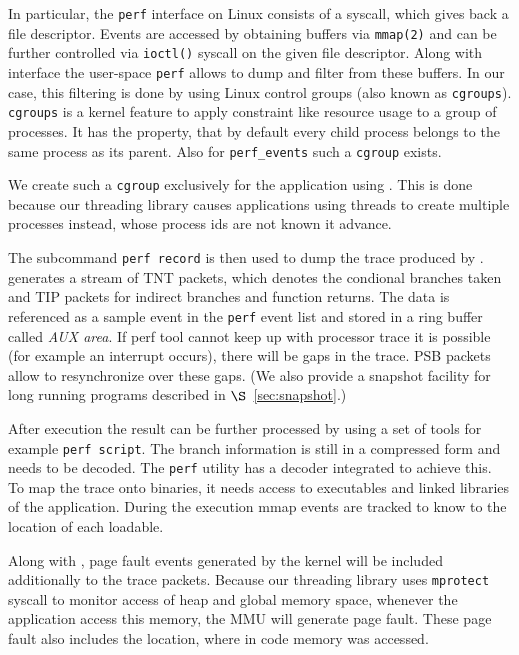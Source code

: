  

In particular, the {\tt perf} interface on Linux consists of a syscall, which gives back a file
descriptor. Events are accessed by obtaining buffers via {\tt mmap(2)} and can be
further controlled via {\tt ioctl()} syscall on the given file descriptor. Along with
interface the user-space {\tt perf} allows to dump and filter from these
buffers. In our case, this filtering is done by using Linux control
groups (also known as {\tt cgroups}). {\tt cgroups} is a kernel feature to apply constraint
like resource usage to a group of processes. It has the property, that by
default every child process belongs to the same process as its parent. Also for
{\tt perf\_events} such a {\tt cgroup} exists.

We create such a {\tt cgroup} exclusively for the application using \projecttitle. This is done because
our threading library causes applications using threads to create multiple
processes instead, whose process ids are not known it advance.

The subcommand {\tt perf record} is then used to dump the trace produced by \intelpt.
\intelpt generates a stream of TNT packets, which denotes the
condional branches taken and TIP packets for indirect branches and function
returns. The data is referenced as a sample event in the {\tt perf} event list and
stored in a ring buffer called \emph{AUX area}. If perf tool cannot
keep up with processor trace it is possible (for example an interrupt occurs),
there will be gaps in the trace. PSB packets allow to resynchronize over these
gaps. (We also provide a snapshot facility for long running programs described in $\S$~\ref{sec:snapshot}.)


After execution the result can be further processed by using a set of tools
for example {\tt perf script}. The branch information is still in a compressed
form and needs to be decoded. The {\tt perf} utility has a decoder integrated to achieve this.
To map the trace onto binaries, it needs access to executables and linked
libraries of the application. During the execution mmap events are tracked to
know to the location of each loadable.




Along with \intelpt, page fault events generated by the kernel will be included
additionally to the trace packets. Because our threading library uses {\tt mprotect}
syscall to monitor access of heap and global memory space, whenever the
application access this memory, the MMU will generate page fault. These
page fault also includes the location, where in code memory was accessed.





